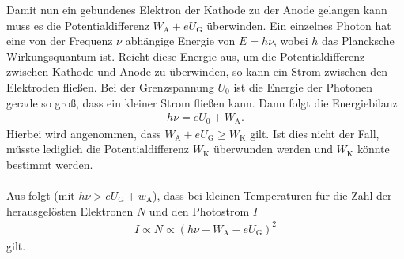 Damit nun ein gebundenes Elektron der Kathode zu der Anode gelangen kann muss es die Potentialdifferenz $W_\mathrm{A}+eU_\mathrm{G}$ überwinden. Ein einzelnes Photon hat eine von der Frequenz $\nu$ abhängige Energie von $E=h\nu$, wobei $h$ das Plancksche Wirkungsquantum ist. Reicht diese Energie aus, um die Potentialdifferenz zwischen Kathode und Anode zu überwinden, so kann ein Strom zwischen den Elektroden fließen. Bei der Grenzspannung $U_0$ ist die Energie der Photonen gerade so groß, dass ein kleiner Strom fließen kann. Dann folgt die Energiebilanz
\begin{align}
  h\nu=eU_0+W_\mathrm{A}.
  \label{eqn:grenzspannung}	
\end{align}
Hierbei wird angenommen, dass $W_\mathrm{A}+eU_\mathrm{G} \geq W_\mathrm{K}$ gilt. Ist dies nicht der Fall, müsste lediglich die Potentialdifferenz $W_\mathrm{K}$ überwunden werden und $W_\mathrm{K}$ könnte bestimmt werden. \\ \\
Aus \cite{kennlinie} folgt (mit $h\nu>eU_\mathrm{G}+w_\mathrm{A}$), dass bei kleinen Temperaturen für die Zahl der herausgelösten Elektronen $N$ und den Photostrom $I$
\begin{align}
  I \propto N \propto \left(  h\nu-W_\mathrm{A}-eU_\mathrm{G}\right)^2
\end{align} 
gilt. 
